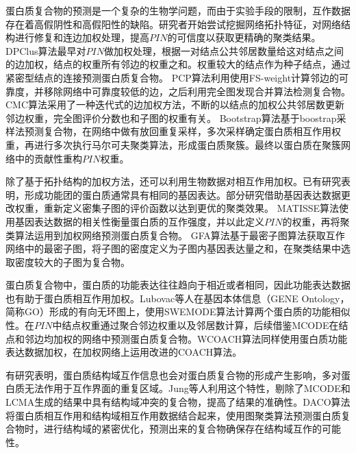 蛋白质复合物的预测是一个复杂的生物学问题，而由于实验手段的限制，互作数据存在着高假阴性和高假阳性的缺陷\cite{von_mering_comparative_2002}。研究者开始尝试挖掘网络拓扑特征，对网络结构进行修复和连边加权处理，提高$PIN$的可信度以获取更精确的聚类结果。
DPClus算法\cite{altaf-ul-amin_development_2006}最早对$PIN$做加权处理，根据一对结点公共邻居数量给这对结点之间的边加权，结点的权重所有邻边的权重之和。权重较大的结点作为种子结点，通过紧密型结点的连接预测蛋白质复合物。
PCP算法\cite{chua_using_2008}利用使用FS-weight计算邻边的可靠度，并移除网络中可靠度较低的边，之后利用完全图发现合并算法检测复合物。
CMC算法\cite{liu_complex_2009}采用了一种迭代式的边加权方法，不断的以结点的加权公共邻居数更新邻边权重，完全图评价分数也和子图的权重有关。
Bootstrap算法\cite{friedel_bootstrapping_2009}基于boostrap采样法预测复合物，在网络中做有放回重复采样，多次采样确定蛋白质相互作用权重，再进行多次执行马尔可夫聚类算法，形成蛋白质聚簇。最终以蛋白质在聚簇网络中的贡献性重构$PIN$权重。

除了基于拓扑结构的加权方法，还可以利用生物数据对相互作用加权。已有研究表明\cite{komurov_revealing_2007}，形成功能团的蛋白质通常具有相同的基因表达。部分研究借助基因表达数据更改权重，重新定义密集子图的评价函数以达到更优的聚类效果。
MATISSE算法\cite{ulitsky_identification_2007}使用基因表达数据的相关性衡量蛋白质的互作强度，并以此定义$PIN$的权重，再将聚类算法运用到加权网络预测蛋白质复合物。
GFA算法\cite{jianxing_feng_max-flow-based_2011}基于最密子图算法获取互作网络中的最密子图，将子图的密度定义为子图内基因表达量之和，在聚类结果中选取密度较大的子图为复合物。

蛋白质复合物中，蛋白质的功能表达往往趋向于相近或者相同，因此功能表达数据也有助于蛋白质相互作用加权。Lubovac等人\cite{lubovac_combining_2006}在基因本体信息\cite{ashburner_gene_2000}（GENE Ontology，简称GO）形成的有向无环图上，使用SWEMODE算法计算两个蛋白质的功能相似性。在$PIN$中结点权重通过聚合邻边权重以及邻居数计算，后续借鉴MCODE在结点和邻边均加权的网络中预测蛋白质复合物。WCOACH算法\cite{kouhsar_wcoach_2016}同样使用蛋白质功能表达数据加权，在加权网络上运用改进的COACH算法\cite{leung_predicting_2009}。

有研究表明，蛋白质结构域互作信息也会对蛋白质复合物的形成产生影响\cite{kim_relating_2006}，多对蛋白质无法作用于互作界面的重复区域。Jung等人\cite{jung_protein_2008}利用这个特性，剔除了MCODE和LCMA生成的结果中具有结构域冲突的复合物，提高了结果的准确性。DACO算法\cite{will_identifying_2014}将蛋白质相互作用和结构域相互作用数据结合起来，使用图聚类算法预测蛋白质复合物时，进行结构域的紧密优化，预测出来的复合物确保存在结构域互作的可能性。


